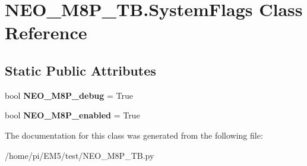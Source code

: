 \hypertarget{classNEO__M8P__TB_1_1SystemFlags}{}\section{N\+E\+O\+\_\+\+M8\+P\+\_\+\+T\+B.\+System\+Flags Class Reference}
\label{classNEO__M8P__TB_1_1SystemFlags}
\subsection*{Static Public Attributes}
\begin{DoxyCompactItemize}
\item 
\mbox{\label{classNEO__M8P__TB_1_1SystemFlags_a5467130fb90cfa677815ea3f4ab34a65}} 
bool {\bfseries N\+E\+O\+\_\+\+M8\+P\+\_\+debug} = True
\item 
\mbox{\label{classNEO__M8P__TB_1_1SystemFlags_af06600f6ae6b713b1feb75ac07186c58}} 
bool {\bfseries N\+E\+O\+\_\+\+M8\+P\+\_\+enabled} = True
\end{DoxyCompactItemize}


The documentation for this class was generated from the following file\+:\begin{DoxyCompactItemize}
\item 
/home/pi/\+E\+M5/test/N\+E\+O\+\_\+\+M8\+P\+\_\+\+T\+B.\+py\end{DoxyCompactItemize}
